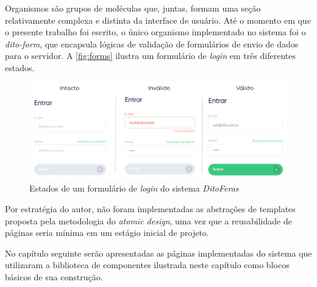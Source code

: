 Organismos são grupos de moléculas que, juntas, formam uma seção relativamente complexa e distinta da interface de usuário. Até o momento em que o presente trabalho foi escrito, o único organismo implementado no sistema foi o \textit{dito-form}, que encapsula lógicas de validação de formulários de envio de dados para o servidor. A \autoref{fig:forms} ilustra um formulário de \textit{login} em três diferentes estados.

\begin{figure}
  \begin{center}
	  \includegraphics[width=\linewidth]{./04-figuras/06_biblioteca_componentes/forms.png}
	\end{center}
  \caption{Estados de um formulário de \textit{login} do sistema \textit{DitoFeras}}
  \label{fig:forms}
\end{figure}

Por estratégia do autor, não foram implementadas as abstrações de templates proposta pela metodologia do \textit{atomic design}, uma vez que a reusabilidade de páginas seria mínima em um estágio inicial de projeto.

No capítulo seguinte serão apresentadas as páginas implementadas do sistema que utilizaram a biblioteca de componentes ilustrada neste capítulo como blocos básicos de sua construção.